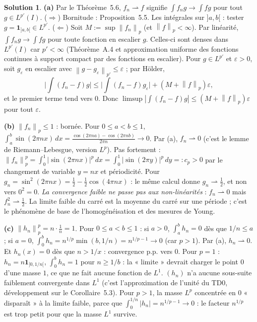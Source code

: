 \documentclass[11pt,a4paper]{article}
\newcommand{\norm}[1]{\left\|#1\right\|}
\newcommand{\wk}{\rightharpoonup}
\theoremstyle{definition}
\newtheorem*{solution}{Solution}
\begin{document}
\begin{solution}
\noindent\textbf{(a)} Par le Théorème~5.6, $f_n\wk f$ signifie $\int f_ng\to\int fg$ pour tout $g\in L^{p'}(I)$. ($\Rightarrow$) Bornitude : Proposition~5.5. Les intégrales sur $]a,b[$ : tester $g=\mathbf 1_{]a,b[}\in L^{p'}$. ($\Leftarrow$) Soit $M:=\sup\norm{f_n}_p$ (et $\norm f_p<\infty$). Par linéarité, $\int f_ng\to\int fg$ pour toute fonction en escalier $g$. Celles-ci sont denses dans $L^{p'}(I)$ car $p'<\infty$ (Théorème~A.4 et approximation uniforme des fonctions continues à support compact par des fonctions en escalier). Pour $g\in L^{p'}$ et $\varepsilon>0$, soit $g_\varepsilon$ en escalier avec $\norm{g-g_\varepsilon}_{p'}\le\varepsilon$ ; par Hölder,
\[
\Big|\int(f_n-f)g\Big|\le\Big|\int(f_n-f)g_\varepsilon\Big|+(M+\norm f_p)\varepsilon ,
\]
et le premier terme tend vers $0$. Donc $\limsup|\int(f_n-f)g|\le(M+\norm f_p)\varepsilon$ pour tout $\varepsilon$.

\medskip
\noindent\textbf{(b)} $\norm{f_n}_p\le1$ : bornée. Pour $0\le a<b\le1$, $\int_a^b\sin(2\pi nx)\,dx=\frac{\cos(2\pi na)-\cos(2\pi nb)}{2\pi n}\to0$. Par (a), $f_n\wk0$ (c'est le lemme de Riemann--Lebesgue, version $L^p$). Pas fortement : $\norm{f_n}_p^p=\int_0^1|\sin(2\pi nx)|^p\,dx=\int_0^1|\sin(2\pi y)|^p\,dy=:c_p>0$ par le changement de variable $y=nx$ et périodicité. Pour $g_n=\sin^2(2\pi nx)=\frac12-\frac12\cos(4\pi nx)$ : le même calcul donne $g_n\wk\frac12$, et non vers $0^2=0$. \emph{La convergence faible ne passe pas aux non-linéarités} : $f_n\wk0$ mais $f_n^2\wk\frac12$. La limite faible du carré est la moyenne du carré sur une période ; c'est le phénomène de base de l'homogénéisation et des mesures de Young.

\medskip
\noindent\textbf{(c)} $\norm{h_n}_p^p=n\cdot\frac1n=1$. Pour $0\le a<b\le1$ : si $a>0$, $\int_a^bh_n=0$ dès que $1/n\le a$ ; si $a=0$, $\int_0^bh_n=n^{1/p}\min(b,1/n)=n^{1/p-1}\to0$ (car $p>1$). Par (a), $h_n\wk0$. Et $h_n(x)=0$ dès que $n>1/x$ : convergence p.p. vers $0$. Pour $p=1$ : $h_n=n\mathbf 1_{]0,1/n[}$, $\int_0^bh_n=1$ pour $n\ge1/b$ : la « limite » devrait charger le point $0$ d'une masse $1$, ce que ne fait aucune fonction de $L^1$. $(h_n)$ n'a aucune sous-suite faiblement convergente dans $L^1$ (c'est l'approximation de l'unité du TD0, développement sur le Corollaire~5.3). Pour $p>1$, la masse $L^p$ concentrée en $0$ « disparaît » à la limite faible, parce que $\int_0^{1/n}|h_n|=n^{1/p-1}\to0$ : le facteur $n^{1/p}$ est trop petit pour que la masse $L^1$ survive.


\end{solution}
\end{document}
